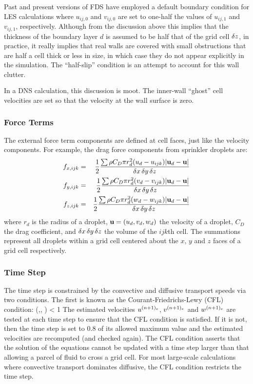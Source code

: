 \documentclass[11pt]{book}
\begin{document}
Past and present versions of FDS have employed a default boundary condition for LES calculations
where $u_{ij,0}$ and $v_{ij,0}$ are set to one-half the values of
$u_{ij,1}$ and $v_{ij,1}$, respectively. Although from the discussion above this implies that the thickness of the
boundary layer $d$ is assumed to
be half that of the grid cell $\delta z$, in practice, it really implies that real walls
are covered with small obstructions that are half a cell thick or
less in size, in which case they do not appear explicitly in the simulation.
The ``half-slip'' condition is an attempt to account for this wall clutter.

In a DNS calculation, this discussion is moot. The inner-wall ``ghost'' cell velocities are
set so that the velocity at the wall surface is zero.



\subsubsection{Force Terms}

The external force term components are defined at cell faces, just like the velocity components. For example, the drag force components
from sprinkler droplets are:
\begin{eqnarray}
f_{x,ijk} &=&\frac{1}{2}\frac{\sum \rho C_D\pi r_d^2 (u_d-u_{ijk}) |{\bf u}_d-{\bf u}|}{\delta x\, \delta y\, \delta z}  \\
f_{y,ijk} &=&\frac{1}{2}\frac{\sum \rho C_D\pi r_d^2 (v_d-v_{ijk}) |{\bf u}_d-{\bf u}|}{\delta x\, \delta y\, \delta z}  \\
f_{z,ijk} &=&\frac{1}{2}\frac{\sum \rho C_D\pi r_d^2 (w_d-w_{ijk}) |{\bf u}_d-{\bf u}|}{\delta x\, \delta y \,\delta z}
\end{eqnarray}
where $r_d$ is the radius of a droplet, ${\bf u}=(u_d,v_d,w_d)$ the velocity of a droplet, $C_D$ the drag
coefficient, and $\delta x \, \delta y \,\delta z$ the volume of the $ijk$th cell.
The summations represent all droplets within a grid cell centered about
the $x$, $y$ and $z$ faces of a grid cell respectively.


\subsubsection{Time Step}

\label{stability}

The time step is constrained by the convective and diffusive
transport speeds via two conditions. The first is known as the
Courant-Friedrichs-Lewy (CFL) condition:
\be \dt \; \max \left(,, \right) < 1  \label{cfl} \ee
The estimated velocities
$u^{(n+1)_e}$, $v^{(n+1)_e}$ and $w^{(n+1)_e}$ are tested at each
time step to ensure that the CFL condition is satisfied. If it is not,
then the time step is set to 0.8 of its allowed maximum value
and the estimated velocities are recomputed (and checked again).
The CFL condition asserts that the solution of the equations cannot be updated with a time step
larger than that allowing a parcel of fluid to cross a grid cell. For most large-scale calculations where
convective transport dominates diffusive, the CFL condition restricts the time step.
\end{document}
